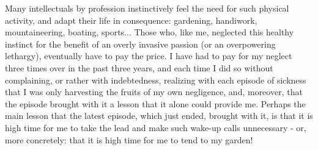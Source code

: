 Many intellectuals by profession instinctively feel the need for such physical activity, and adapt their life in consequence: gardening, handiwork, mountaineering, boating, sports... Those who, like me, neglected this healthy instinct for the benefit of an overly invasive passion (or an overpowering lethargy), eventually have to pay the price. I have had to pay for my neglect three times over in the past three years, and each time I did so without complaining, or rather with indebtedness, realizing with each episode of sickness that I was only harvesting the fruits of my own negligence, and, moreover, that the episode brought with it a lesson that it alone could provide me. Perhaps the main lesson that the latest episode, which just ended, brought with it, is that it is high time for me to take the lead and make such wake-up calls unnecessary - or, more concretely: that it is high time for me to tend to my garden!

 













%
